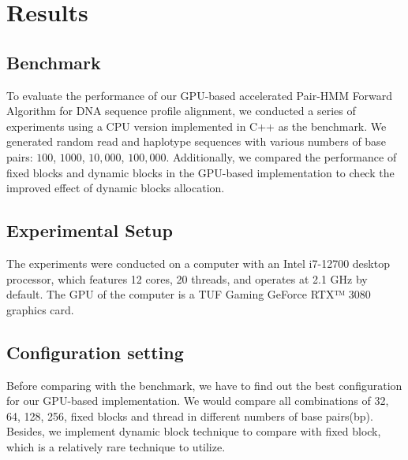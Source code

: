 \documentclass[PhD]{PHlab-thesis}
\begin{document}
\chapter{Results}

\section{Benchmark}
To evaluate the performance of our GPU-based accelerated Pair-HMM Forward Algorithm for DNA sequence profile alignment, we conducted a series of experiments using a CPU version implemented in C++ as the benchmark. We generated random read and haplotype sequences with various numbers of base pairs: $100$, $1000$,  $10,000$, $100,000$. Additionally, we compared the performance of fixed blocks and dynamic blocks in the GPU-based implementation to check the improved effect of dynamic blocks allocation.

\section{Experimental Setup}
The experiments were conducted on a computer with an Intel i7-12700 desktop processor, which features 12 cores, 20 threads, and operates at 2.1 GHz by default. The GPU of the computer is a TUF Gaming GeForce RTX™ 3080 graphics card.

\section{Configuration setting}
Before comparing with the benchmark, we have to find out the best configuration for our GPU-based implementation. We would compare all combinations of 32, 64, 128, 256, fixed blocks and thread in different numbers of base pairs(bp). Besides, we implement dynamic block technique to compare with fixed block, which is a relatively rare technique to utilize.
\end{document}
